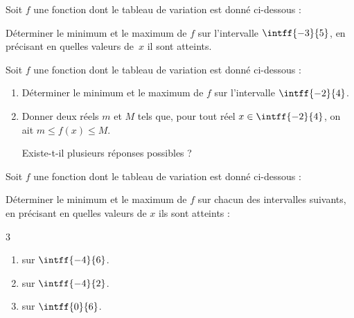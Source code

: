 \exo

Soit $f$ une fonction dont le tableau de variation est donné ci-dessous :
\begin{center}
\end{center}
Déterminer le minimum et le maximum de $f$ sur l'intervalle $\intff{-3}{5}$, en précisant en quelles valeurs de~$x$ il sont atteints.

\exo

Soit $f$ une fonction dont le tableau de variation est donné ci-dessous :
\begin{center}
\end{center}
\begin{enumerate}
\item Déterminer le minimum et le maximum de $f$ sur l'intervalle $\intff{-2}{4}$.
\item Donner deux réels $m$ et $M$ tels que, pour tout réel $x\in\intff{-2}{4}$, on ait $m\leqslant f(x)\leqslant M$.

Existe-t-il plusieurs réponses possibles ?
\end{enumerate}

\exo

Soit $f$ une fonction dont le tableau de variation est donné ci-dessous :
\begin{center}
\end{center}
Déterminer le minimum et le maximum de $f$ sur chacun des intervalles suivants, en précisant en quelles valeurs de $x$ ils sont atteints :
\vspace{-12pt}
\setlength{\columnsep}{1cm}
\setlength{\columnseprule}{0pt}
\begin{multicols}{3}
\begin{enumerate}
\item sur $\intff{-4}{6}$.
\item sur $\intff{-4}{2}$.
\item sur $\intff{0}{6}$.
\end{enumerate}
\end{multicols}

